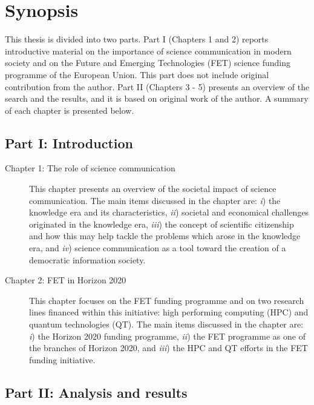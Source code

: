 \chapter*{Synopsis}
This thesis is divided into two parts. Part I (Chapters 1 and 2) reports introductive material on the importance of science communication in modern society and on the Future and Emerging Technologies (FET) science funding programme of the European Union. This part does not include original contribution from the author. Part II (Chapters 3 - 5) presents an overview of the search and the results, and it is based on original work of the author. A summary of each chapter is presented below.

\section*{Part I: Introduction}

\begin{description}
 \item [Chapter 1: The role of science communication] This chapter presents an overview of the societal impact of science communication. The main items discussed in the chapter are: \emph{i}) the knowledge era and its characteristics, \emph{ii}) societal and economical challenges originated in the knowledge era, \emph{iii}) the concept of scientific citizenship and how this may help tackle the problems which arose in the knowledge era, and \emph{iv}) science communication as a tool toward the creation of a democratic information society.

 \item [Chapter 2: FET in Horizon 2020] This chapter focuses on the FET funding programme and on two research lines financed within this initiative: high performing computing (HPC) and quantum technologies (QT). The main items discussed in the chapter are: \emph{i}) the Horizon 2020 funding programme, \emph{ii}) the FET programme as one of the branches of Horizon 2020, and \emph{iii}) the HPC and QT efforts in the FET funding initiative.
\end{description}

\section*{Part II: Analysis and results}

